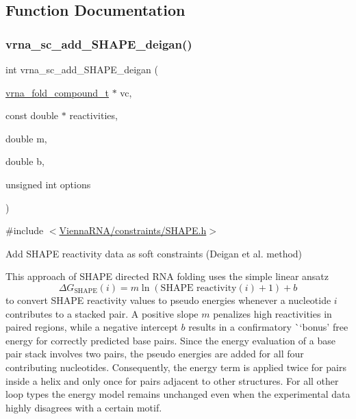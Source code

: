 \subsection{Function Documentation}
\mbox{\label{group__SHAPE__reactivities_ga57d612b58e1c61dd6cfcb5a843f8f1b3}} 
\subsubsection{\texorpdfstring{vrna\_sc\_add\_SHAPE\_deigan()}{vrna\_sc\_add\_SHAPE\_deigan()}}
{\footnotesize\ttfamily int vrna\+\_\+sc\+\_\+add\+\_\+\+S\+H\+A\+P\+E\+\_\+deigan (\begin{DoxyParamCaption}\item[{\mbox{\hyperlink{group__fold__compound_ga1b0cef17fd40466cef5968eaeeff6166}{vrna\+\_\+fold\+\_\+compound\+\_\+t}} $\ast$}]{vc,  }\item[{const double $\ast$}]{reactivities,  }\item[{double}]{m,  }\item[{double}]{b,  }\item[{unsigned int}]{options }\end{DoxyParamCaption})}



{\ttfamily \#include $<$\mbox{\hyperlink{SHAPE_8h}{Vienna\+R\+N\+A/constraints/\+S\+H\+A\+P\+E.\+h}}$>$}



Add S\+H\+A\+PE reactivity data as soft constraints (Deigan et al. method) 

This approach of S\+H\+A\+PE directed R\+NA folding uses the simple linear ansatz \[ \Delta G_{\text{SHAPE}}(i) = m \ln(\text{SHAPE reactivity}(i)+1)+ b \] to convert S\+H\+A\+PE reactivity values to pseudo energies whenever a nucleotide $ i $ contributes to a stacked pair. A positive slope $ m $ penalizes high reactivities in paired regions, while a negative intercept $ b $ results in a confirmatory \`{}`bonus'\textquotesingle{} free energy for correctly predicted base pairs. Since the energy evaluation of a base pair stack involves two pairs, the pseudo energies are added for all four contributing nucleotides. Consequently, the energy term is applied twice for pairs inside a helix and only once for pairs adjacent to other structures. For all other loop types the energy model remains unchanged even when the experimental data highly disagrees with a certain motif.

